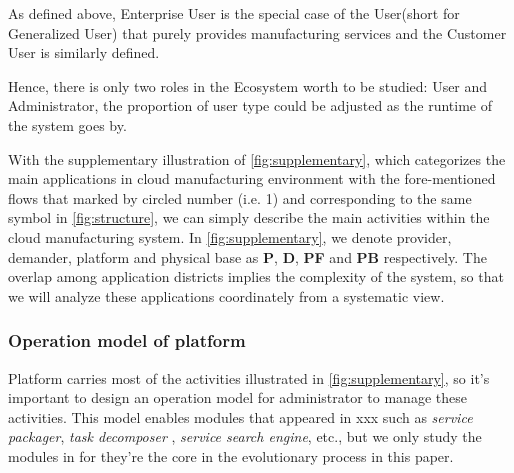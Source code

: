 As defined above, Enterprise User is the special case of the User(short for Generalized User) that purely provides manufacturing services and the Customer User is similarly defined.

Hence, there is only two roles in the Ecosystem worth to be studied: User and Administrator, the proportion of user type could be adjusted as the runtime of the system goes by.


With the supplementary illustration of \autoref{fig:supplementary}, which categorizes the main applications in cloud manufacturing environment with the fore-mentioned flows that marked by circled number (i.e. \textcircled{\small{1}}) and corresponding to the same symbol in \autoref{fig:structure}, we can simply describe the main activities within the cloud manufacturing system. In \autoref{fig:supplementary}, we denote provider, demander, platform and physical base as \textbf{P}, \textbf{D}, \textbf{PF} and \textbf{PB} respectively. The overlap among application districts implies the complexity of the system, so that we will analyze these applications coordinately from a systematic view.



\subsubsection{Operation model of platform}
\label{ssub:operation_model_of_platform}
Platform carries most of the activities illustrated in \autoref{fig:supplementary}, so it's important to design an operation model for administrator to manage these activities. This model enables modules that appeared in xxx such as \textit{service packager}, \textit{task decomposer} , \textit{service search engine}, etc., but we only study the modules in for they're the core in the evolutionary process in this paper.

